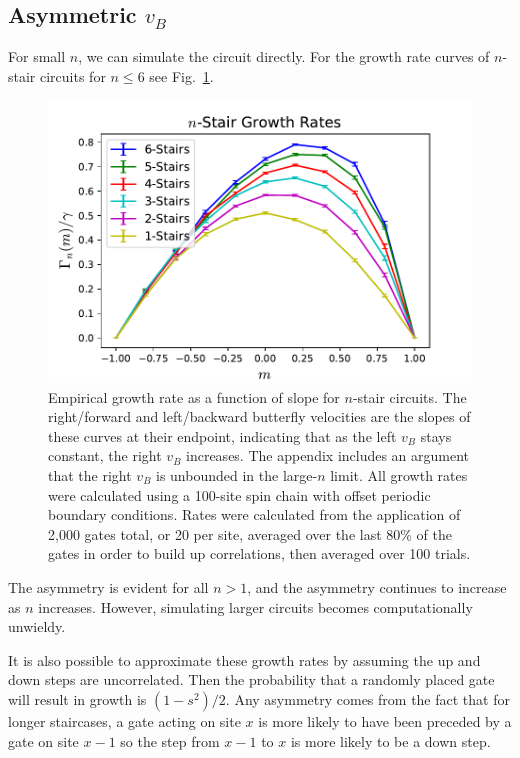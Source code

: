\documentclass[aps,prx,reprint,superscriptaddress, longbibliography]{revtex4-1}
\begin{document}
\subsection{Asymmetric $v_B$}

For small $n$, we can simulate the circuit directly. For the growth rate curves of $n$-stair circuits for $n\le 6$ see Fig.~\ref{fig:compareRates}. 
\begin{figure}
	\includegraphics[width=\columnwidth]{compareRates.pdf}
	\caption{Empirical growth rate as a function of slope for $n$-stair circuits. The right/forward and left/backward butterfly velocities are the slopes of these curves at their endpoint, indicating that as the left $v_B$ stays constant, the right $v_B$ increases. The appendix includes an argument that the right $v_B$ is unbounded in the large-$n$ limit. All growth rates were calculated using a 100-site spin chain with offset periodic boundary conditions. Rates were calculated from the application of 2,000 gates total, or 20 per site, averaged over the last 80\% of the gates in order to build up correlations, then averaged over 100 trials.}
	\label{fig:compareRates}
\end{figure}
The asymmetry is evident for all $n>1$, and the asymmetry continues to increase as $n$ increases. However, simulating larger circuits becomes computationally unwieldy.
	
It is also possible to approximate these growth rates by assuming the up and down steps are uncorrelated. Then the probability that a randomly placed gate will result in growth is $(1-s^2)/2$. Any asymmetry comes from the fact that for longer staircases, a gate acting on site $x$ is more likely to have been preceded by a gate on site $x-1$ so the step from $x-1$ to $x$ is more likely to be a down step.
\end{document}
